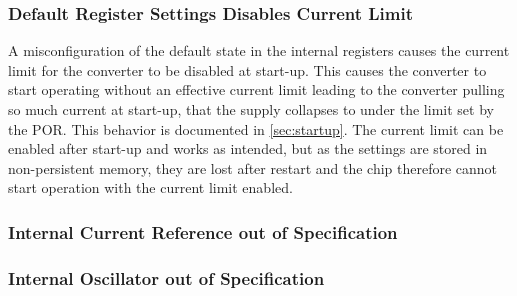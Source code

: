 \subsubsection{Default Register Settings Disables Current Limit}
\label{sec:missingcurrentlimit}

A misconfiguration of the default state in the internal registers causes the current limit for the converter to be disabled at start-up. This causes the converter to start operating without an effective current limit leading to the converter pulling so much current at start-up, that the supply collapses to under the limit set by the \ac{POR}. This behavior is documented in \autoref{sec:startup}. The current limit can be enabled after start-up and works as intended, but as the settings are stored in non-persistent memory, they are lost after restart and the chip therefore cannot start operation with the current limit enabled. 


\subsubsection{Internal Current Reference out of Specification}

\subsubsection{Internal Oscillator out of Specification}